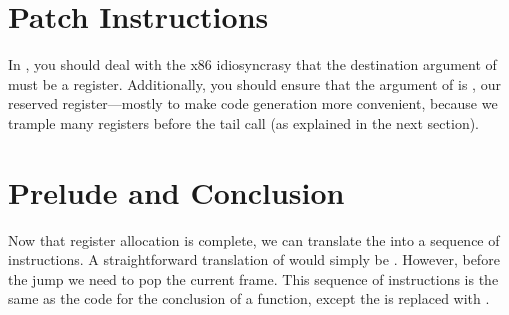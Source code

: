 \documentclass[7x10,nocrop]{TimesAPriori_MIT}%
\begin{document}
\section{Patch Instructions}

In , you should deal with the x86
idiosyncrasy that the destination argument of  must be a
register. Additionally, you should ensure that the argument of
 is , our reserved register---mostly to make
code generation more convenient, because we trample many registers
before the tail call (as explained in the next section).

\section{Prelude and Conclusion}


Now that register allocation is complete, we can translate the
 into a sequence of instructions. A straightforward
translation of  would simply be .
However, before the jump we need to pop the current frame. This
sequence of instructions is the same as the code for the conclusion of
a function, except the  is replaced with .
\end{document}
